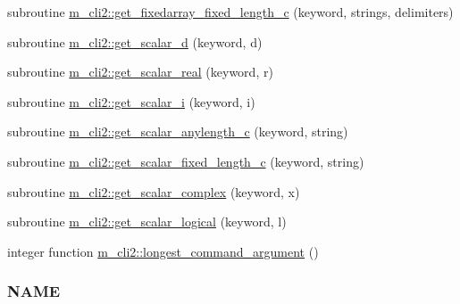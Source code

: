 \begin{DoxyCompactItemize}
\item 
subroutine \mbox{\hyperlink{namespacem__cli2_a8000c5e05f6c84ba17350d4a00850a6a}{m\+\_\+cli2\+::get\+\_\+fixedarray\+\_\+fixed\+\_\+length\+\_\+c}} (keyword, strings, delimiters)
\item 
subroutine \mbox{\hyperlink{namespacem__cli2_a338757660adde093db76b7d5559a1906}{m\+\_\+cli2\+::get\+\_\+scalar\+\_\+d}} (keyword, d)
\item 
subroutine \mbox{\hyperlink{namespacem__cli2_ad089d91c66626de91bcda84523e80b54}{m\+\_\+cli2\+::get\+\_\+scalar\+\_\+real}} (keyword, r)
\item 
subroutine \mbox{\hyperlink{namespacem__cli2_a9c5208ef6763da7e68dd1e118bea0b7a}{m\+\_\+cli2\+::get\+\_\+scalar\+\_\+i}} (keyword, i)
\item 
subroutine \mbox{\hyperlink{namespacem__cli2_a7429381c83a021ba3ffb32ed58e17a0e}{m\+\_\+cli2\+::get\+\_\+scalar\+\_\+anylength\+\_\+c}} (keyword, string)
\item 
subroutine \mbox{\hyperlink{namespacem__cli2_a9dcc99d34db1771959a1461274ae073e}{m\+\_\+cli2\+::get\+\_\+scalar\+\_\+fixed\+\_\+length\+\_\+c}} (keyword, string)
\item 
subroutine \mbox{\hyperlink{namespacem__cli2_a2af4dd786acb5cb2dbd6e43667109490}{m\+\_\+cli2\+::get\+\_\+scalar\+\_\+complex}} (keyword, x)
\item 
subroutine \mbox{\hyperlink{namespacem__cli2_a138d07d14246ee532ce36e67719e8c7d}{m\+\_\+cli2\+::get\+\_\+scalar\+\_\+logical}} (keyword, l)
\item 
integer function \mbox{\hyperlink{namespacem__cli2_a7240f12031027172b87fde623bd77958}{m\+\_\+cli2\+::longest\+\_\+command\+\_\+argument}} ()
\begin{DoxyCompactList}\small\item\em \subsubsection*{N\+A\+ME}


\end{DoxyCompactList}
\end{DoxyCompactItemize}
